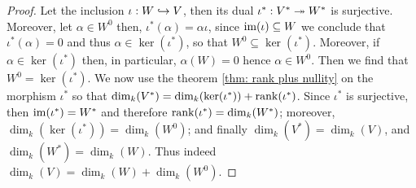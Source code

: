 \begin{proof}
    Let the inclusion \(\iota : W \hookrightarrow V\), then its dual \(\iota^\ast :
    V^\ast \twoheadrightarrow W^\ast\) is surjective. Moreover, let \(\alpha \in
    W^0\) then, \(\iota^\ast(\alpha) = \alpha  \iota\), since \(\operatorname{im}(\iota)
    \subseteq W\) we conclude that \(\iota^\ast(\alpha) = 0\) and thus \(\alpha
    \in \ker(\iota^\ast)\), so that \(W^0 \subseteq \ker(\iota^\ast)\). Moreover,
    if \(\alpha \in \ker(\iota^\ast)\) then, in particular, \(\alpha(W) = 0\)
    hence \(\alpha \in W^0\). Then we find that \(W^0 = \ker(\iota^\ast)\). We now
    use the theorem \ref{thm: rank plus nullity} on the morphism \(\iota^\ast\) so
    that \(\dim_k(V^\ast) = \dim_k(\ker(\iota^\ast)) + \operatorname{rank}(\iota^\ast)\). Since
    \(\iota^\ast\) is surjective, then \(\operatorname{im}(\iota^\ast) = W^\ast\) and therefore
    \(\operatorname{rank}(\iota^\ast) = \dim_k(W^\ast)\); moreover, \(\dim_k(\ker(\iota^\ast)) =
    \dim_k(W^0)\); and finally \(\dim_k(V^\ast) = \dim_k(V)\), and
    \(\dim_k(W^\ast) = \dim_k(W)\). Thus indeed \(\dim_k(V) = \dim_k(W) +
    \dim_k(W^0)\).
\end{proof}
